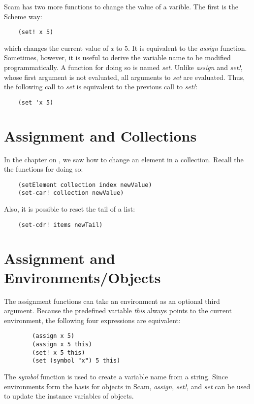 Scam has two more functions to change the value of a
varible. The first is the Scheme way:

\begin{verbatim}
    (set! x 5)
\end{verbatim}

which changes the current value of {\it x} to 5.
It is equivalent to the {\it assign} function.
Sometimes, however, it is useful to derive the variable name
to be modified programmatically.
A function for doing so is named {\it set}. Unlike {\it assign} and {\it set!},
whose first argument is not evaluated, all arguments to
{\it set} are evaluated. Thus, the following call to {\it set} is
equivalent to the previous call to {\it set!}:

\begin{verbatim}
    (set 'x 5)
\end{verbatim}

\section{Assignment and Collections}

In the chapter on
,
we saw how to change an element in a collection. Recall the
the functions for doing so:

\begin{verbatim}
    (setElement collection index newValue)
    (set-car! collection newValue)
\end{verbatim}

Also, it is possible to reset the tail of a list:

\begin{verbatim}
    (set-cdr! items newTail)
\end{verbatim}

\section{Assignment and Environments/Objects}

The assignment functions can take an environment as an
optional third argument.
Because the predefined variable
{\it this} always points to the current environment,
the following
four expressions are equivalent:

\begin{verbatim}
        (assign x 5)
        (assign x 5 this)
        (set! x 5 this)
        (set (symbol "x") 5 this)
\end{verbatim}

The {\it symbol} function is used to create a variable name from
a string.
Since environments form the basis for objects in Scam,
{\it assign}, {\it set!}, and {\it set} 
can be used to update the instance variables
of objects.
